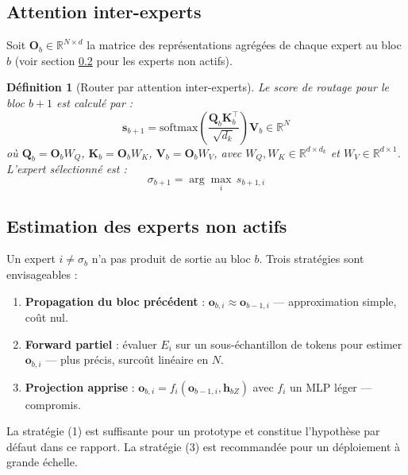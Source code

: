 \documentclass[10pt,a4paper]{article}
\newtheorem{definition}{Définition}
\begin{document}
\subsection{Attention inter-experts}

Soit $\mathbf{O}_b \in \mathbb{R}^{N \times d}$ la matrice des représentations agrégées de chaque expert au bloc $b$ (voir section \ref{sec:estimation} pour les experts non actifs).

\begin{definition}[Router par attention inter-experts]
Le score de routage pour le bloc $b+1$ est calculé par :
\begin{equation}
  \mathbf{s}_{b+1} = \mathrm{softmax}\!\left(\frac{\mathbf{Q}_b \mathbf{K}_b^\top}{\sqrt{d_k}}\right)\mathbf{V}_b \in \mathbb{R}^{N}
\end{equation}
où $\mathbf{Q}_b = \mathbf{O}_b W_Q$, $\mathbf{K}_b = \mathbf{O}_b W_K$, $\mathbf{V}_b = \mathbf{O}_b W_V$, avec $W_Q, W_K \in \mathbb{R}^{d \times d_k}$ et $W_V \in \mathbb{R}^{d \times 1}$. L'expert sélectionné est :
\begin{equation}
  \sigma_{b+1} = \arg\max_{i}\, s_{b+1,i}
\end{equation}
\end{definition}

\subsection{Estimation des experts non actifs}
\label{sec:estimation}

Un expert $i \neq \sigma_b$ n'a pas produit de sortie au bloc $b$. Trois stratégies sont envisageables :
\begin{enumerate}
  \item \textbf{Propagation du bloc précédent} : $\mathbf{o}_{b,i} \approx \mathbf{o}_{b-1,i}$ — approximation simple, coût nul.
  \item \textbf{Forward partiel} : évaluer $E_i$ sur un sous-échantillon de tokens pour estimer $\mathbf{o}_{b,i}$ — plus précis, surcoût linéaire en $N$.
  \item \textbf{Projection apprise} : $\mathbf{o}_{b,i} = f_i(\mathbf{o}_{b-1,i}, \mathbf{h}_{bZ})$ avec $f_i$ un MLP léger — compromis.
\end{enumerate}

La stratégie (1) est suffisante pour un prototype et constitue l'hypothèse par défaut dans ce rapport. La stratégie (3) est recommandée pour un déploiement à grande échelle.
\end{document}
